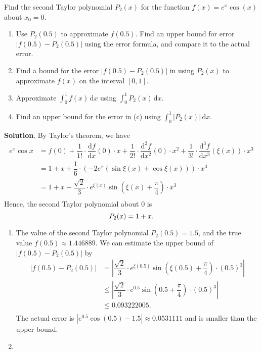 \documentclass[11pt]{article}
\theoremstyle{break}
\newcommand{\dd}{\text{d}}
\newcommand{\ddi}{\text{$\,$d}}
\numberwithin{equation}{theorem}
\begin{document}
\newpage
\begin{problem}\label{problem 3}
    Find the second Taylor polynomial $P_2(x)$ for the function $f(x)=e^x\cos(x)$ about $x_0=0$.
    \begin{enumerate}
        \item Use $P_2(0.5)$ to approximate $f(0.5)$. Find an upper bound for error $|f(0.5)-P_2(0.5)|$ using the error formula, and compare it to the actual error.
        \item Find a bound for the error $|f(0.5)-P_2(0.5)|$ in using $P_2(x)$ to approximate $f(x)$ on the interval $[0, 1]$.
        \item Approximate $\displaystyle\int_{0}^{1}f(x)\ddi x$ using $\displaystyle\int_{0}^{1}P_2(x)\ddi x$.
        \item Find an upper bound for the error in (c) using $\displaystyle\int_{0}^{1}|P_2(x)|\ddi x$.
    \end{enumerate}
\end{problem}
\textbf{Solution}. By Taylor's theorem, we have \vspace{-0.6em}
\begin{align*}
    e^x\cos x&=f(0)+\dfrac{1}{1!}\cdot\dfrac{\dd f}{\dd x}(0)\cdot x+\dfrac{1}{2!}\cdot\dfrac{\dd^2 f}{\dd x^2}(0)\cdot x^2+\dfrac{1}{3!}\cdot\dfrac{\dd^3 f}{\dd x^3}(\xi(x))\cdot x^3\\
    &=1+x+\dfrac{1}{6}\cdot\left(-2e^x\left(\sin \xi(x)+\cos \xi(x)\right) \right) \cdot x^3\\
    &=1+x-\dfrac{\sqrt{2}}{3}\cdot e^{\xi(x)}\sin\left(\xi(x)+\dfrac{\pi}{4}\right) \cdot x^3\\[-3.4em]
\end{align*}
Hence, the second Taylor polynomial about $0$ is \vspace{-0.6em}
\begin{equation*}
    P_2(x)=1+x. \vspace{-0.6em}
\end{equation*}
\begin{enumerate}
    \item The value of the second Taylor polynomial $P_2(0.5)=1.5$, and the true value $f(0.5)\approx1.446889$. We can estimate the upper bound of $|f(0.5)-P_2(0.5)|$ by \vspace{-0.6em}
    \begin{align*}
        |f(0.5)-P_2(0.5)|&=\left\lvert \dfrac{\sqrt{2}}{3}\cdot e^{\xi(0.5)}\sin\left(\xi(0.5)+\dfrac{\pi}{4}\right) \cdot ({0.5})^3\right\rvert\\
        &\leq\left\lvert \dfrac{\sqrt{2}}{3}\cdot e^{0.5}\sin\left(0.5+\dfrac{\pi}{4}\right) \cdot ({0.5})^3\right\rvert\\
        &\leq 0.093222005.\\[-3.4em]
    \end{align*}
    The actual error is $\left\lvert e^{0.5}\cos(0.5)-1.5\right\rvert\approx0.0531111$ and is smaller than the upper bound.
    \item 
\end{enumerate}
\end{document}

